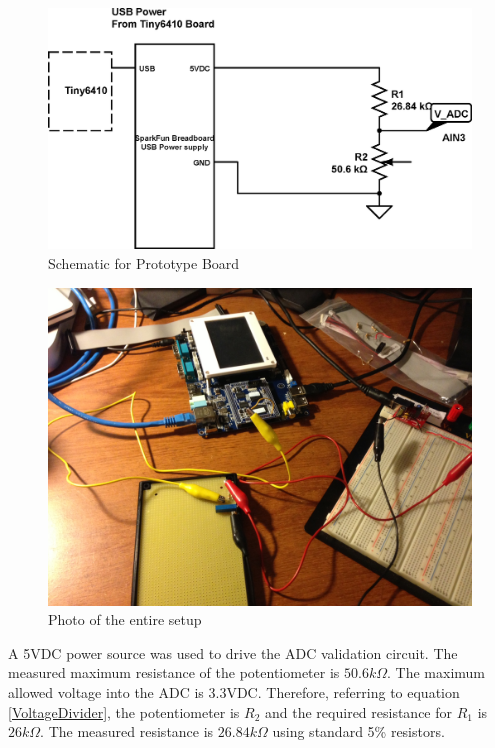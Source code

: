 \documentclass[10pt,conference]{IEEEtran}
\begin{document}
\begin{figure}[ht]
	\includegraphics[scale=.35]{cmpe242_adc_validator}
	\caption{Schematic for Prototype Board}\label{cmpe242_adc_validator}
\end{figure}

\begin{figure}[ht!]
	\includegraphics[scale=.15]{cmpe242_lab2.jpg}
	\caption{Photo of the entire setup}\label{cmpe242_lab2_photo}
\end{figure}

A 5VDC power source was used to drive the ADC validation circuit. The measured maximum resistance of the potentiometer is $50.6k\Omega$. The maximum allowed voltage into the ADC is 3.3VDC. Therefore, referring to equation \ref{VoltageDivider}, the potentiometer is $R_2$ and the required resistance for $R_1$ is $26k\Omega$. The measured resistance is $26.84k\Omega$ using standard 5\% resistors.
\end{document}
